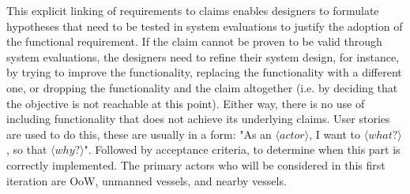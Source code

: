 This explicit linking of requirements to claims enables designers to formulate hypotheses that need to be tested in system evaluations to justify the adoption of the functional requirement. If the claim cannot be proven to be valid through system evaluations, the designers need to refine their system design, for instance, by trying to improve the functionality, replacing the functionality with a different one, or dropping the functionality and the claim altogether (i.e. by deciding that the objective is not reachable at this point). Either way, there is no use of including functionality that does not achieve its underlying claims. User stories are used to do this, these are usually in a form: "As an $\langle actor \rangle$, I want to $\langle what? \rangle$, so that $\langle why? \rangle$". Followed by acceptance criteria, to determine when this part is correctly implemented.
The primary actors who will be considered in this first iteration are \acf{OoW}, unmanned vessels, and nearby vessels.

